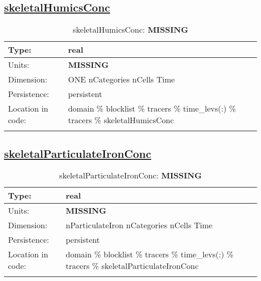 \subsection[skeletalHumicsConc]{\hyperref[sec:var_tab_tracers]{skeletalHumicsConc}}
\label{subsec:var_sec_tracers_skeletalHumicsConc}
\begin{center}
\begin{longtable}{| p{2.0in} | p{4.0in} |}
        \hline 
        Type: & real \\
        \hline 
        Units: & {\bf \color{red} MISSING} \\
        \hline 
        Dimension: & ONE nCategories nCells Time \\
        \hline 
        Persistence: & persistent \\
        \hline 
         Location in code: & domain \% blocklist \% tracers \% time\_levs(:) \% tracers \% skeletalHumicsConc \\
         \hline 
    \caption{skeletalHumicsConc: {\bf \color{red} MISSING}}
\end{longtable}
\end{center}
\subsection[skeletalParticulateIronConc]{\hyperref[sec:var_tab_tracers]{skeletalParticulateIronConc}}
\label{subsec:var_sec_tracers_skeletalParticulateIronConc}
\begin{center}
\begin{longtable}{| p{2.0in} | p{4.0in} |}
        \hline 
        Type: & real \\
        \hline 
        Units: & {\bf \color{red} MISSING} \\
        \hline 
        Dimension: & nParticulateIron nCategories nCells Time \\
        \hline 
        Persistence: & persistent \\
        \hline 
         Location in code: & domain \% blocklist \% tracers \% time\_levs(:) \% tracers \% skeletalParticulateIronConc \\
         \hline 
    \caption{skeletalParticulateIronConc: {\bf \color{red} MISSING}}
\end{longtable}
\end{center}
